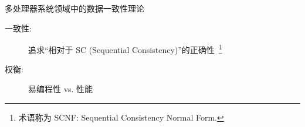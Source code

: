 \begin{frame}{多处理器系统领域中的数据一致性理论}
  \vspace{0.20cm}

  \begin{description}
	\item[一致性:] 追求``相对于 SC {\small (Sequential Consistency)}''的正确性~\footnote{术语称为 SCNF: Sequential Consistency Normal Form.} 
	\item[权衡:] 易编程性 vs. 性能
  \end{description}


\end{frame}
